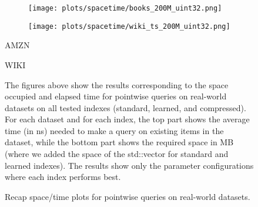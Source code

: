 \documentclass{article}
\begin{document}
\begin{figure}[!htbp]
{\begin{minipage}[t][0.98\textheight][t]{\textwidth}
    \begin{minipage}{0.48\linewidth}
        \begin{figure}[H]
        \texttt{[image: plots/spacetime/books\_200M\_uint32.png]}
        \end{figure}
    \end{minipage}
    \begin{minipage}{0.48\linewidth}
        \begin{figure}[H]
        \texttt{[image: plots/spacetime/wiki\_ts\_200M\_uint32.png]}
        \end{figure}
    \end{minipage}
    \begin{minipage}{0.48\linewidth}
    \begin{center}
        AMZN
    \end{center}
    \end{minipage}
    \begin{minipage}{0.48\linewidth}
    \begin{center}
        WIKI
    \end{center}
    \end{minipage}

    \vspace{20px}
    \begin{minipage}{\linewidth}
    The figures above show the results corresponding to the space occupied and elapsed time for pointwise queries on real-world datasets on all tested indexes (standard, learned, and compressed). For each dataset and for each index, the top part shows the average time (in ns) needed to make a query on existing items in the dataset, while the bottom part shows the required space in MB (where we added the space of the std::vector for standard and learned indexes).  
    The results show only the parameter configurations where each index performs best. 
    \end{minipage}
    \vspace{10px}
\end{minipage}
}
\caption{Recap space/time plots for pointwise queries on real-world datasets.}
\end{figure}
\end{document}
